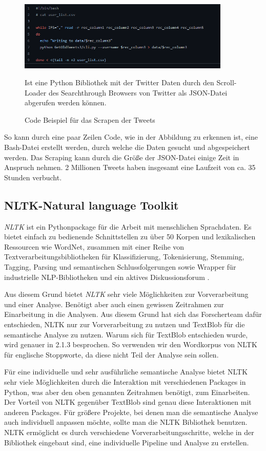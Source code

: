 	\begin{figure}[ht]
		\centering
		\includegraphics[width=0.9\textwidth]{images/Kapitel2/Code_Beispiel_1}
			\caption{\label{fig:CodeBeispiel}Code Beispiel für das Scrapen der Tweets}{Ist eine Python Bibliothek mit der Twitter Daten durch den Scroll-Loader des Searchthrough Browsers von Twitter als JSON-Datei abgerufen werden können.}
	\end{figure}
	
So kann durch eine paar Zeilen Code, wie in der Abbildung \label{CodeBeispiel} zu erkennen ist, eine Bash-Datei erstellt werden, durch welche die Daten gesucht und abgespeichert werden. Das Scraping kann durch die Größe der JSON-Datei einige Zeit in Anspruch nehmen. 2 Millionen Tweets haben insgesamt eine Laufzeit von ca. 35 Stunden verbucht.

\subsection{NLTK-Natural language Toolkit}
	
\textit{NLTK} ist ein Pythonpackage für die Arbeit mit menschlichen Sprachdaten. Es bietet einfach zu bedienende Schnittstellen zu über 50 Korpen und lexikalischen Ressourcen wie WordNet, zusammen mit einer Reihe von Textverarbeitungsbibliotheken für Klassifizierung, Tokenisierung, Stemming, Tagging, Parsing und semantischen Schlussfolgerungen sowie Wrapper für industrielle NLP-Bibliotheken und ein aktives Diskussionsforum .
	
Aus diesem Grund bietet \textit{NLTK} sehr viele Möglichkeiten zur Vorverarbeitung und einer Analyse. Benötigt aber auch einen gewissen Zeitrahmen zur Einarbeitung in die Analysen. Aus diesem Grund hat sich das Forscherteam dafür entschieden, NLTK nur zur Vorverarbeitung zu nutzen und TextBlob für die semantische Analyse zu nutzen. Warum sich für TextBlob entschieden wurde, wird genauer in 2.1.3 besprochen. So verwenden wir den Wordkorpus von NLTK für englische Stoppworte, da diese nicht Teil der Analyse sein sollen.
	
Für eine individuelle und sehr ausführliche semantische Analyse bietet NLTK sehr viele Möglichkeiten durch die Interaktion mit verschiedenen Packages in Python, was aber den oben genannten Zeitrahmen benötigt, zum Einarbeiten. Der Vorteil von NLTK gegenüber TextBlob sind genau diese Interaktionen mit anderen Packages. Für größere Projekte, bei denen man die semantische Analyse auch individuell anpassen möchte, sollte man die NLTK Bibliothek benutzen. NLTK ermöglicht es durch verschiedene Vorverarbeitungsschritte, welche in der Bibliothek eingebaut sind, eine individuelle Pipeline und Analyse zu erstellen.
	
